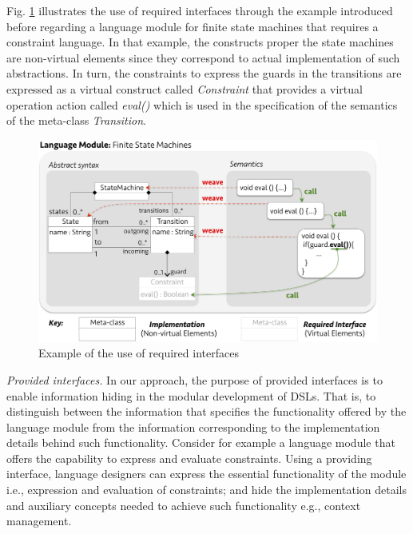Fig. \ref{fig:fig-req-example-fig} illustrates the use of required interfaces through the example introduced before regarding a language module for finite state machines that requires a constraint language. In that example, the constructs proper the state machines are non-virtual elements since they correspond to actual implementation of such abstractions. In turn, the constraints to express the guards in the transitions are expressed as a virtual construct called \textsl{Constraint} that provides a virtual operation action called \textsl{eval()} which is used in the specification of the semantics of the meta-class \textsl{Transition}. 

\begin{figure}
  \centering\includegraphics[width=0.86\linewidth]{images/fig-req-example-fig.png}
  \caption{Example of the use of required interfaces}
  \label{fig:fig-req-example-fig}
\end{figure}

\vspace{2mm}
\textit{Provided interfaces.} In our approach, the purpose of provided interfaces is to enable information hiding in the modular development of DSLs. That is, to distinguish between the information that specifies the functionality offered by the language module from the information corresponding to the implementation details behind such functionality. Consider for example a language module that offers the capability to express and evaluate constraints. Using a providing interface, language designers can express the essential functionality of the module i.e., expression and evaluation of constraints; and hide the implementation details and auxiliary concepts needed to achieve such functionality e.g., context management.

